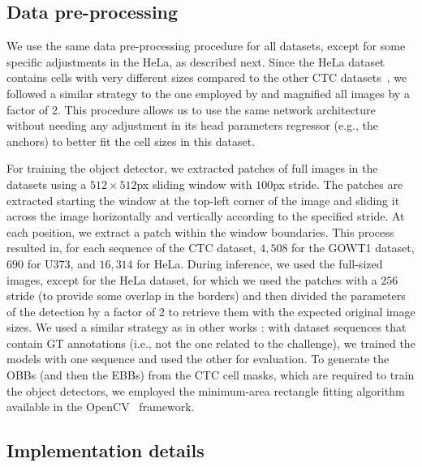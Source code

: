 \documentclass{article}
\begin{document}
\subsection{Data pre-processing} \label{sec:data_handling}

We use the same data pre-processing procedure for all datasets, except for some specific adjustments in the HeLa, as described next. Since the HeLa dataset contains cells with very different sizes compared to the other CTC datasets~\cite{isbi}, we followed a similar strategy to the one employed by \cite{cpn} and magnified all images by a factor of 2. This procedure allows us to use the same network architecture without needing any adjustment in its head parameters regressor (e.g., the anchors) to better fit the cell sizes in this dataset.

For training the object detector, we extracted patches of  full images in the datasets using a $512\!\times\!512$px sliding window with $100$px stride. The patches are extracted starting the window at the top-left corner of the image and sliding it across the image horizontally and vertically according to the specified stride. At each position, we extract a patch within the window boundaries. This process resulted in, for each sequence of the CTC dataset, $4,\!508$ for the GOWT1 dataset, $690$ for U373, and $16,\!314$ for HeLa. During inference, we used the full-sized images, except for the HeLa dataset, for which we used the patches with a $256$ stride (to provide some overlap in the borders) and then divided the parameters of the detection by a factor of 2 to retrieve them with the expected original image sizes. We used a similar strategy as in other works \cite{kth,epflheid,blob,cpn,drl}: with dataset sequences that contain GT annotations (i.e., not the one related to the challenge), we trained the models with one sequence and used the other for evaluation.   
To generate the OBBs (and then the EBBs) from the CTC cell masks, which are required to train the object detectors, we employed the minimum-area rectangle fitting algorithm available in the OpenCV~\cite{opencv} framework.


\subsection{Implementation details}
\end{document}
